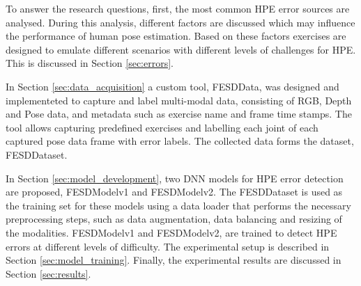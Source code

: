 To answer the research questions, first, the most common HPE error sources are analysed. During this analysis, different factors are discussed which may influence the performance of human pose estimation. Based on these factors exercises are designed to emulate different scenarios with different levels of challenges for HPE. This is discussed in Section \ref{sec:errors}.

In Section \ref{sec:data_acquisition} a custom tool, FESDData, was designed and implementeted to capture and label multi-modal data, consisting of RGB, Depth and Pose data, and metadata such as exercise name and frame time stamps. The tool allows capturing predefined exercises and labelling each joint of each captured pose data frame with error labels. The collected data forms the dataset, FESDDataset.

In Section \ref{sec:model_development}, two DNN models for HPE error detection are proposed, FESDModelv1 and FESDModelv2. The FESDDataset is used as the training set for these models using a data loader that performs the necessary preprocessing steps, such as data augmentation, data balancing and resizing of the modalities. FESDModelv1 and FESDModelv2, are trained to detect HPE errors at different levels of difficulty. The experimental setup is described in Section \ref{sec:model_training}. Finally, the experimental results are discussed in Section \ref{sec:results}.

